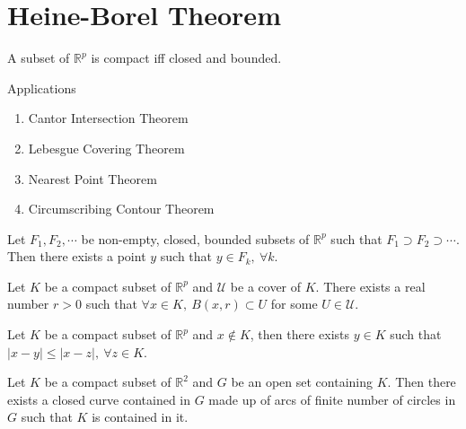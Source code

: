 \section{Heine-Borel Theorem}
	\begin{theorem}
		A subset of $\mathbb{R}^p$ is compact iff closed and bounded.
	\end{theorem}
	\begin{remark}
		Applications
		\begin{enumerate}
			\item Cantor Intersection Theorem
			\item Lebesgue Covering Theorem
			\item Nearest Point Theorem
			\item Circumscribing Contour Theorem
		\end{enumerate}
	\end{remark}
	\begin{theorem}
		Let $F_1, F_2, \cdots$ be non-empty, closed, bounded subsets of $\mathbb{R}^p$ such that $F_1 \supset F_2 \supset \cdots$. Then there exists a point $y$ such that $y \in F_k,\ \forall k$.
	\end{theorem}
	\begin{theorem}
		Let $K$ be a compact subset of $\mathbb{R}^p$ and $\mathcal{U}$ be a cover of $K$. There exists a real number $r > 0$ such that $\forall x \in K,\ B(x,r) \subset U$ for some $U \in \mathcal{U}$.
	\end{theorem}
	\begin{theorem}
		Let $K$ be a compact subset of $\mathbb{R}^p$ and $x \not\in K$, then there exists $y \in K$ such that $|x-y| \le |x-z|,\ \forall z \in K$.
	\end{theorem}
	\begin{theorem}
		Let $K$ be a compact subset of $\mathbb{R}^2$ and $G$ be an open set containing $K$. Then there exists a closed curve contained in $G$ made up of arcs of finite number of circles in $G$ such that $K$ is contained in it. 
	\end{theorem}
